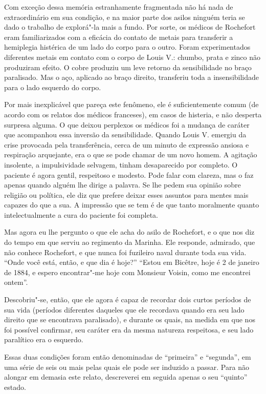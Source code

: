 Com exceção dessa memória estranhamente fragmentada não há nada de
extraordinário em sua condição, e na maior parte dos asilos ninguém
teria se dado o trabalho de explorá"-la mais a fundo.  Por sorte, os
médicos de Rochefort eram familiarizados com a eficácia do contato de
metais para transferir a hemiplegia histérica de um lado do corpo para
o outro. Foram experimentados diferentes metais em contato com o corpo
de Louis V.: chumbo, prata e zinco não produziram efeito.  O cobre
produziu um leve retorno da sensibilidade no braço paralisado.  Mas o
aço, aplicado ao braço direito, transferiu toda a insensibilidade para
o lado esquerdo do corpo.

Por mais inexplicável que pareça este fenômeno, ele é suficientemente
comum (de acordo com os relatos dos médicos franceses), em casos de
histeria, e não desperta surpresa alguma.  O que deixou perplexos os
médicos foi a mudança de caráter que acompanhou essa inversão da
sensibilidade.  Quando Louis V. emergiu da crise provocada pela
transferência, cerca de um minuto de expressão ansiosa e respiração
arquejante, era o que se pode chamar de um novo homem.  A agitação
insolente, a impulsividade selvagem, tinham desaparecido por completo.
O paciente é agora gentil, respeitoso e modesto.  Pode falar com
clareza, mas o faz apenas quando alguém lhe dirige a palavra.  Se lhe
pedem sua opinião sobre religião ou política, ele diz que prefere
deixar esses assuntos para mentes mais capazes do que a sua. A
impressão que se tem é de que tanto moralmente quanto intelectualmente
a cura do paciente foi completa. 

Mas agora eu lhe pergunto o que ele acha do asilo de Rochefort, e o que
nos diz do tempo em que serviu ao regimento da Marinha. Ele responde,
admirado, que não conhece Rochefort, e que nunca foi fuzileiro naval
durante toda sua vida.  “Onde você está, então, e que dia é hoje?”
“Estou em Bicêtre, hoje é 2 de janeiro de 1884, e espero encontrar"-me
hoje com Monsieur Voisin, como me encontrei ontem”.

Descobriu"-se, então, que ele agora é capaz de recordar dois curtos
períodos de sua vida (períodos diferentes daqueles que ele recordava
quando era seu lado direito que se encontrava paralisado), e durante os
quais, na medida em que nos foi possível confirmar, seu caráter era da
mesma natureza respeitosa, e seu lado paralítico era o esquerdo.

Essas duas condições foram então denominadas de “primeira” e “segunda”,
em uma série de seis ou mais pelas quais ele pode ser induzido a
passar.  Para não alongar em demasia este relato, descreverei em
seguida apenas o seu “quinto” estado.

